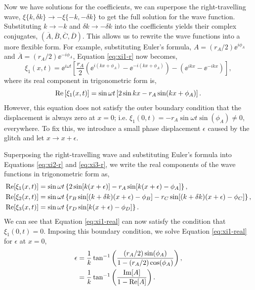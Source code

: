 Now we have solutions for the coefficients, we can superpose the right-travelling wave, \(\xi\{k, \delta k\} \rightarrow - \xi\{-k, -\delta k\}\) to get the full solution for the wave function. Substituting \(k \rightarrow -k\) and \(\delta k \rightarrow -\delta k\) into the coefficients yields their complex conjugates, \((\overline{A},\overline{B},\overline{C},\overline{D})\). This allows us to rewrite the wave functions into a more flexible form. For example, substituting Euler's formula, \(A = (r_A/2) \ee^{i\phi_A}\) and \(\overline{A} = (r_A/2) \ee^{-i\phi_A}\), Equation \ref{eq:xi1-r} now becomes,
%
\begin{equation}
    \xi_1(x, t) = \ee^{i \omega t} \left[ \frac{r_A}{2} \left( \ee^{i(kx + \phi_A)} - \ee^{-i(kx + \phi_A)} \right) - \left( \ee^{ikx} - \ee^{-ikx} \right) \right], \label{eq:xi1}
\end{equation}
%
where its real component in trigonometric form is,
\begin{equation}
    {\mathrm{Re}}\left[\xi_1(x, t)\right] = \sin \omega t \left[2 \sin kx - r_A \sin(kx + \phi_A)\right].
\end{equation}
%
However, this equation does not satisfy the outer boundary condition that the displacement is always zero at \(x=0\); i.e. \(\xi_1(0, t) = - r_A \sin \omega t \sin(\phi_A) \neq 0\), everywhere. To fix this, we introduce a small phase displacement \(\epsilon\) caused by the glitch and let \(x \rightarrow x + \epsilon\).

Superposing the right-travelling wave and substituting Euler's formula into Equations \ref{eq:xi2-r} and \ref{eq:xi3-r}, we write the real components of the wave functions in trigonometric form as,
%
\begin{align}
    {\mathrm{Re}}[\xi_1(x, t)] &= \sin \omega t \left\{2 \sin[k (x + \epsilon)] - r_A \sin[k(x + \epsilon) - \phi_A]\right\}, \label{eq:xi1-real} \\
    {\mathrm{Re}}[\xi_2(x, t)] &= \sin \omega t \left\{ r_B \sin[(k + \delta k)(x + \epsilon) - \phi_B] - r_C \sin[(k + \delta k)(x + \epsilon) - \phi_C]\right\}, \\
    {\mathrm{Re}}[\xi_3(x, t)] &= \sin \omega t \left\{r_D \sin[k(x + \epsilon) - \phi_D]\right\}. \label{eq:xi3-real}
\end{align}
%
We can see that Equation \ref{eq:xi1-real} can now satisfy the condition that \(\xi_1(0, t) = 0\). Imposing this boundary condition, we solve Equation \ref{eq:xi1-real} for \(\epsilon\) at \(x=0\),
%
\begin{align}
    \epsilon &= \frac{1}{k} \tan^{-1}\left( \frac{(r_A / 2) \sin(\phi_A)}{1 - (r_A/2) \cos(\phi_A)} \right), \notag\\
    &= \frac{1}{k} \tan^{-1}\left( \frac{{\mathrm{Im}}[A]}{1 - {\mathrm{Re}}[A]} \right). \label{eq:1d-phase}
\end{align}
%

